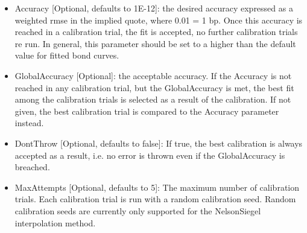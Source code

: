 \begin{itemize}
\item Accuracy [Optional, defaults to 1E-12]: the desired accuracy expressed as a weighted rmse in the implied quote,
  where 0.01 = 1 bp. Once this accuracy is reached in a calibration trial, the fit is accepted, no further calibration
  trials re run. In general, this parameter should be set to a higher than the default value for fitted bond curves.
\item GlobalAccuracy [Optional]: the acceptable accuracy. If the Accuracy is not reached in any calibration trial, but
  the GlobalAccuracy is met, the best fit among the calibration trials is selected as a result of the calibration. If
  not given, the best calibration trial is compared to the Accuracy parameter instead.
\item DontThrow [Optional, defaults to false]: If true, the best calibration is always accepted as a result, i.e. no
  error is thrown even if the GlobalAccuracy is breached.
\item MaxAttempts [Optional, defaults to 5]: The maximum number of calibration trials. Each calibration trial is run with a random calibration
  seed. Random calibration seeds are currently only supported for the NelsonSiegel interpolation method.
\end{itemize}

